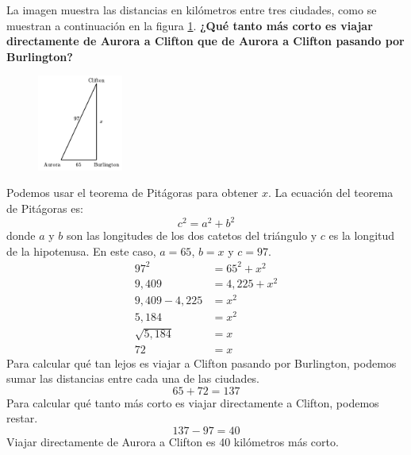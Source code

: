 La imagen muestra las distancias en kilómetros entre tres ciudades, como se muestran a continuación en la figura \ref{fig:proverb_pitagoras_04}.
\textbf{¿Qué tanto más corto es viajar directamente de Aurora a Clifton que de Aurora a Clifton pasando por Burlington?}\\

\begin{figure}[H]
    \centering
    \includegraphics[width=0.25\textwidth]{../images/proverb_pitagoras_04.png}
    \caption{}
    \label{fig:proverb_pitagoras_04}
\end{figure}

\begin{solutionbox}{11cm}
    Podemos usar el teorema de Pitágoras para obtener $x$.
    La ecuación del teorema de Pitágoras es:
    \[c^2=a^2+b^2\]
    donde $a$ y $b$ son las longitudes de los dos catetos del triángulo y $c$ es la longitud de la hipotenusa.
    En este caso, $a=65$, $b=x$ y $c=97$.
    \begin{align*}
        97^2         & =65^2+x^2     \\
        9,409        & = 4,225 + x^2 \\
        9,409-4,225  & =x^2          \\
        5,184        & =x^2          \\
        \sqrt{5,184} & =x            \\
        72           & = x
    \end{align*}
    Para calcular qué tan lejos es viajar a Clifton pasando por Burlington, podemos sumar las distancias entre cada una de las ciudades.
    \[65+72=137\]
    Para calcular qué tanto más corto es viajar directamente a Clifton, podemos restar.
    \[137-97=40\]
    Viajar directamente de Aurora a Clifton es 40 kilómetros más corto.
\end{solutionbox}